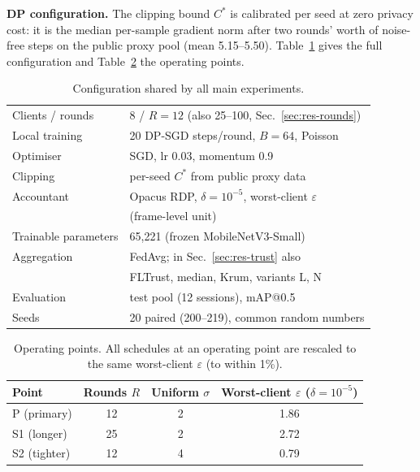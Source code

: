 \documentclass[journal]{IEEEtran}
\makeatletter
\newcommand{\eps}{\varepsilon}
\newcommand{\mAP}{mAP@0.5}
\makeatother
\begin{document}
\textbf{DP configuration.} The clipping bound $C^\ast$ is calibrated per seed at zero privacy cost: it
is the median per-sample gradient norm after two rounds' worth of noise-free steps on the public
proxy pool (mean 5.15--5.50). Table~\ref{tab:config} gives the full configuration and
Table~\ref{tab:ops} the operating points.

\begin{table}[t]
\centering
\caption{Configuration shared by all main experiments.}
\label{tab:config}
\begin{tabular}{@{}ll@{}}
\toprule
Clients / rounds & 8 / $R = 12$ (also 25--100, Sec.~\ref{sec:res-rounds})\\
Local training & 20 DP-SGD steps/round, $B = 64$, Poisson\\
Optimiser & SGD, lr 0.03, momentum 0.9\\
Clipping & per-seed $C^\ast$ from public proxy data\\
Accountant & Opacus RDP, $\delta = 10^{-5}$, worst-client $\eps$\\
 & (frame-level unit)\\
Trainable parameters & 65,221 (frozen MobileNetV3-Small)\\
Aggregation & FedAvg; in Sec.~\ref{sec:res-trust} also\\
 & FLTrust, median, Krum, variants L, N\\
Evaluation & test pool (12 sessions), \mAP{}\\
Seeds & 20 paired (200--219), common random numbers\\
\bottomrule
\end{tabular}
\end{table}

\begin{table}[t]
\centering
\caption{Operating points. All schedules at an operating point are rescaled to the same
worst-client $\eps$ (to within 1\%).}
\label{tab:ops}
\begin{tabular}{@{}lccc@{}}
\toprule
Point & Rounds $R$ & Uniform $\sigma$ & Worst-client $\eps$ ($\delta = 10^{-5}$)\\
\midrule
P (primary) & 12 & 2 & 1.86\\
S1 (longer) & 25 & 2 & 2.72\\
S2 (tighter) & 12 & 4 & 0.79\\
\bottomrule
\end{tabular}
\end{table}
\end{document}
